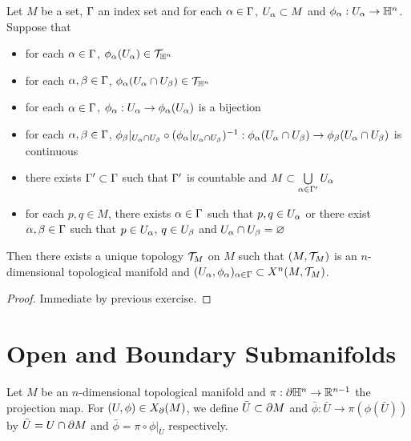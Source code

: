 \documentclass{book}
\begin{document}
	\begin{ex}
		Let $M$ be a set, $\Gamma$ an index set and for each $\alpha \in \Gamma$, $U_{\alpha} \subset M$ and $\phi_{\alpha}: U_{\alpha} \rightarrow \mathbb{H}^n$. Suppose that 
		\begin{itemize}
			\item for each $\alpha \in \Gamma$, $\phi_{\alpha}(U_{\alpha}) \in \mathcal{T}_{\mathbb{H}^n}$ 
			\item for each $\alpha, \beta \in \Gamma$, $\phi_{\alpha}(U_{\alpha} \cap U_{\beta}) \in \mathcal{T}_{\mathbb{H}^n}$
			\item for each $\alpha \in \Gamma$, $\phi_{\alpha}: U_{\alpha} \rightarrow \phi_{\alpha}(U_{\alpha})$ is a bijection
			\item for each $\alpha, \beta \in \Gamma$, $\phi_{\beta}|_{U_{\alpha} \cap U_{\beta}} \circ (\phi_{\alpha}|_{U_{\alpha} \cap U_{\beta}})^{-1}: \phi_{\alpha}(U_{\alpha} \cap U_{\beta}) \rightarrow \phi_{\beta}(U_{\alpha} \cap U_{\beta})$ is continuous
			\item there exists $\Gamma' \subset \Gamma$ such that $\Gamma'$ is countable and $M \subset \bigcup\limits_{\alpha \in \Gamma'} U_{\alpha}$
			\item for each $p,q \in M$, there exists $\alpha \in \Gamma$ such that $p,q \in U_{\alpha}$ or there exist $\alpha,\beta \in \Gamma$ such that $p \in U_{\alpha}$, $q \in U_{\beta}$ and $U_{\alpha} \cap U_{\beta} = \varnothing$
		\end{itemize}
		Then there exists a unique topology $\mathcal{T}_M$ on $M$ such that $(M, \mathcal{T}_M)$ is an $n$-dimensional topological manifold and $(U_{\alpha}, \phi_{\alpha})_{\alpha \in \Gamma} \subset X^n(M, \mathcal{T}_M)$.
	\end{ex}
	
	\begin{proof}
		Immediate by previous exercise. 
	\end{proof}
	


























	\section{Open and Boundary Submanifolds}
	\begin{defn}
		Let $M$ be an $n$-dimensional topological manifold and $\pi:\partial \mathbb{H}^n \rightarrow \mathbb{R}^{n-1}$ the projection map. For $(U, \phi) \in X_{\partial}(M)$, we define $\bar{U} \subset \partial M$ and $\bar{\phi}: \bar{U} \rightarrow \pi (\phi(\bar{U}))$ by $\bar{U} = U \cap \partial M$ and $\bar{\phi} = \pi \circ \phi|_{\bar{U}}$ respectively. 
	\end{defn}
\end{document}
